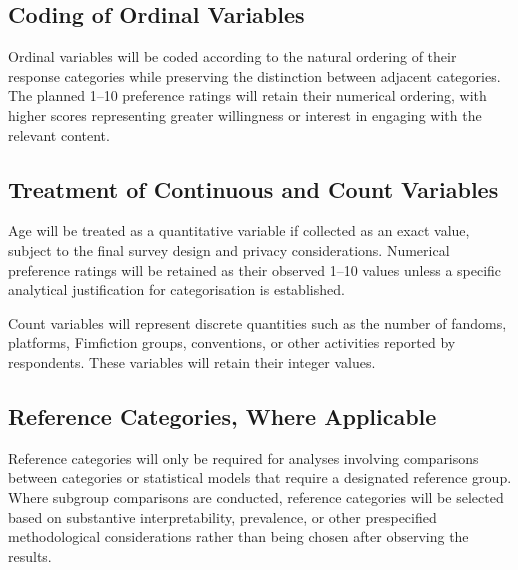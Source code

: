 
\subsection{Coding of Ordinal Variables}

Ordinal variables will be coded according to the natural ordering of their response categories while preserving the distinction between adjacent categories. The planned 1--10 preference ratings will retain their numerical ordering, with higher scores representing greater willingness or interest in engaging with the relevant content.


\subsection{Treatment of Continuous and Count Variables}

Age will be treated as a quantitative variable if collected as an exact value, subject to the final survey design and privacy considerations. Numerical preference ratings will be retained as their observed 1--10 values unless a specific analytical justification for categorisation is established.

Count variables will represent discrete quantities such as the number of fandoms, platforms, Fimfiction groups, conventions, or other activities reported by respondents. These variables will retain their integer values.


\subsection{Reference Categories, Where Applicable}

Reference categories will only be required for analyses involving comparisons between categories or statistical models that require a designated reference group. Where subgroup comparisons are conducted, reference categories will be selected based on substantive interpretability, prevalence, or other prespecified methodological considerations rather than being chosen after observing the results.

